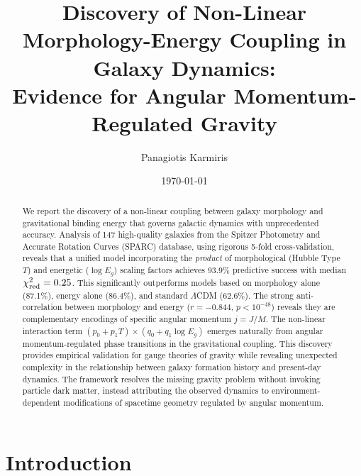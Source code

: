 \documentclass[aps,prd,twocolumn,superscriptaddress,nofootinbib,longbibliography]{revtex4-2}
\begin{document}
\title{Discovery of Non-Linear Morphology-Energy Coupling in Galaxy Dynamics: \\ 
       Evidence for Angular Momentum-Regulated Gravity}

\author{Panagiotis Karmiris}


\date{\today}

\begin{abstract}
We report the discovery of a non-linear coupling between galaxy morphology and gravitational binding energy that governs galactic dynamics with unprecedented accuracy. Analysis of 147 high-quality galaxies from the Spitzer Photometry and Accurate Rotation Curves (SPARC) database, using rigorous 5-fold cross-validation, reveals that a unified model incorporating the \textit{product} of morphological (Hubble Type $T$) and energetic ($\log E_g$) scaling factors achieves 93.9\% predictive success with median $\chi^2_{\rm red} = 0.25$. This significantly outperforms models based on morphology alone (87.1\%), energy alone (86.4\%), and standard $\Lambda$CDM (62.6\%). The strong anti-correlation between morphology and energy ($r = -0.844$, $p < 10^{-48}$) reveals they are complementary encodings of specific angular momentum $j = J/M$. The non-linear interaction term $(p_0 + p_1 T) \times (q_0 + q_1 \log E_g)$ emerges naturally from angular momentum-regulated phase transitions in the gravitational coupling. This discovery provides empirical validation for gauge theories of gravity while revealing unexpected complexity in the relationship between galaxy formation history and present-day dynamics. The framework resolves the missing gravity problem without invoking particle dark matter, instead attributing the observed dynamics to environment-dependent modifications of spacetime geometry regulated by angular momentum.
\end{abstract}


\maketitle

\section{Introduction}
\end{document}
